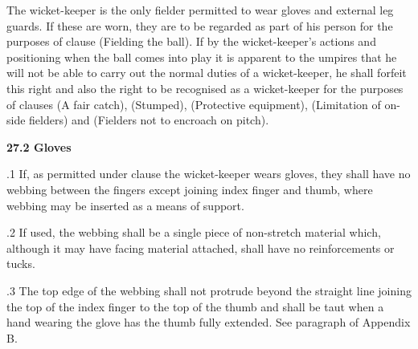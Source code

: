 \documentclass[12pt]{article}
\begin{document}
\vspace{\baselineskip}
\begin{adjustwidth}{0.0in}{0.07in}
{\fontsize{9pt}{10.8pt}\selectfont The wicket-keeper is the only fielder permitted to wear gloves and external leg guards. If these are worn, they are to be regarded as part of his person for the purposes of clause (Fielding the ball). If by the wicket-keeper’s actions and positioning when the ball comes into play it is apparent to the umpires that he will not be able to carry out the normal duties of a wicket-keeper, he shall forfeit this right and also the right to be recognised as a wicket-keeper for the purposes of clauses (A fair catch), (Stumped), (Protective equipment), (Limitation of on-side fielders) and (Fielders not to encroach on pitch).\par}\par

\end{adjustwidth}


\vspace{\baselineskip}
{\fontsize{11pt}{13.2pt}\selectfont \textbf{27.2 \tabto{0.47in} Gloves}\par}\par


\vspace{\baselineskip}
\begin{adjustwidth}{0.5in}{0.04in}
{\fontsize{9pt}{10.8pt}.1 \tabto{0.49in} If, as permitted under clause the wicket-keeper wears gloves, they shall have no webbing between the fingers except joining index finger and thumb, where webbing may be inserted as a means of support.\par}\par

\end{adjustwidth}


\vspace{\baselineskip}
\begin{adjustwidth}{0.5in}{0.39in}
{\fontsize{9pt}{10.8pt}.2 \tabto{0.49in} If used, the webbing shall be a single piece of non-stretch material which, although it may have facing material attached, shall have no reinforcements or tucks.\par}\par

\end{adjustwidth}


\vspace{\baselineskip}
\begin{adjustwidth}{0.5in}{0.11in}
{\fontsize{9pt}{10.8pt}.3 \tabto{0.49in} The top edge of the webbing shall not protrude beyond the straight line joining the top of the index finger to the top of the thumb and shall be taut when a hand wearing the glove has the thumb fully extended. See paragraph of Appendix B.\par}\par

\end{adjustwidth}
\end{document}
